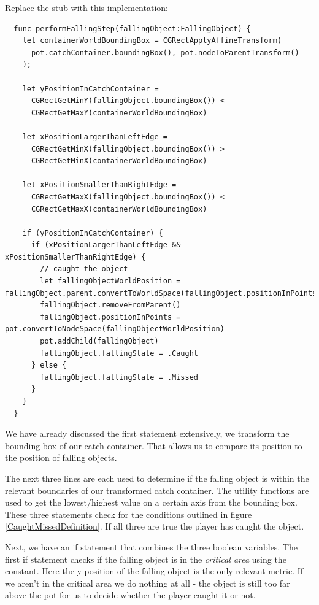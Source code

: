 \begin{leftbar}
Replace the  stub with this implementation:
\begin{lstlisting}
  func performFallingStep(fallingObject:FallingObject) {
    let containerWorldBoundingBox = CGRectApplyAffineTransform(
      pot.catchContainer.boundingBox(), pot.nodeToParentTransform()
    );
    
    let yPositionInCatchContainer = 
      CGRectGetMinY(fallingObject.boundingBox()) <
      CGRectGetMaxY(containerWorldBoundingBox)
       
    let xPositionLargerThanLeftEdge = 
      CGRectGetMinX(fallingObject.boundingBox()) >
      CGRectGetMinX(containerWorldBoundingBox) 
      
    let xPositionSmallerThanRightEdge = 
      CGRectGetMaxX(fallingObject.boundingBox()) < 
      CGRectGetMaxX(containerWorldBoundingBox)
    
    if (yPositionInCatchContainer) {
      if (xPositionLargerThanLeftEdge && xPositionSmallerThanRightEdge) {
        // caught the object
        let fallingObjectWorldPosition = fallingObject.parent.convertToWorldSpace(fallingObject.positionInPoints)
        fallingObject.removeFromParent()
        fallingObject.positionInPoints = pot.convertToNodeSpace(fallingObjectWorldPosition)
        pot.addChild(fallingObject)
        fallingObject.fallingState = .Caught
      } else {
        fallingObject.fallingState = .Missed
      }
    }
  }

\end{lstlisting}
\end{leftbar}

We have already discussed the first statement extensively, we transform the
bounding box of our catch container. That allows us to compare its position to
the position of falling objects. 

The next three lines are each used to
determine if the falling object is within the relevant boundaries of our transformed catch container. The
 utility functions are used to get the
lowest/highest value on a certain axis from the bounding box. These three
statements check for the conditions outlined in figure
\ref{CaughtMissedDefinition}. If all three are true the player has caught the
object.

Next, we have an if statement that combines the three boolean variables. The
first if statement checks if the falling object is in the
\textit{critical area} using the 
constant. Here the y position of the falling object is the only relevant metric.
If we aren't in the critical area we do nothing at all - the object is still too
far above the pot for us to decide whether the player caught it or not.

